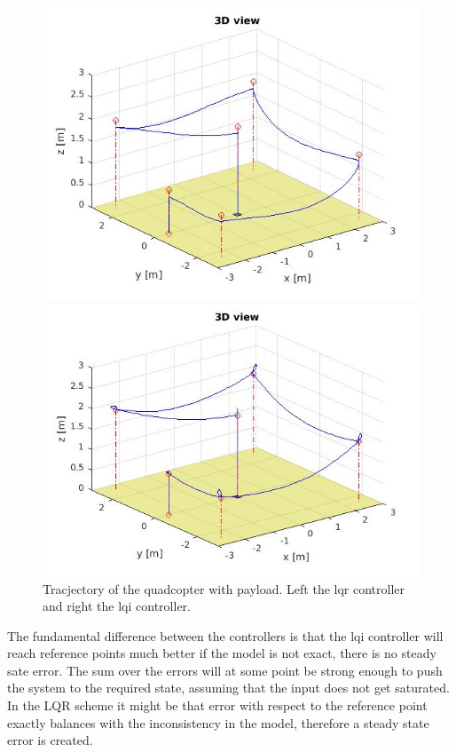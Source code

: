 \documentclass[]{article}
\begin{document}
\begin{figure}[H]
\begin{minipage}{.5\textwidth}
\includegraphics[width=\textwidth]{trajectorypayload.jpg}
\end{minipage}%
\begin{minipage}{.5\textwidth}
\includegraphics[width=\textwidth]{trajectorypayloadi.jpg}
\end{minipage}
\caption{Tracjectory of the quadcopter with payload. Left the lqr controller and right the lqi controller.}
\end{figure}

The fundamental difference between the controllers is that the lqi controller will reach reference points much better if the model is not exact, there is no steady sate error. The sum over the errors will at some point be strong enough to push the system to the required state, assuming that the input does not get saturated. In the LQR scheme it might be that error with respect to the reference point exactly balances with the inconsistency in the model, therefore a steady state error is created.
\end{document}
